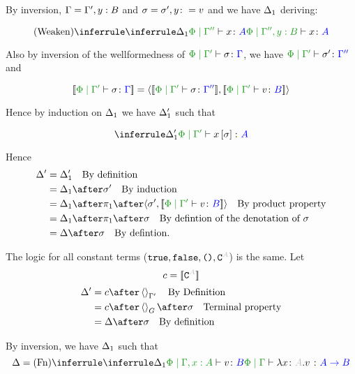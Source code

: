 \documentclass{report}
\begin{document}
By inversion, $\Gamma = \Gamma', y:B$ and $\sigma = \sigma', y\colon= v$
and we have $\Delta_1$ deriving:

\begin{equation}
    \ntreeruleI{Weaken}{\treeruleI{\D_1}{\etyperelation{\P}{\G''}{x}{A}}}{\etyperelation{\P}{\G'',y: B}{x}{A}}
\end{equation}

Also by inversion of the wellformedness of $\etyperelation{\P}{\G'}{\si}{\G}$, we have $\etyperelation{\P}{\G'}{\si'}{\G''}$ and 

\begin{equation}
    \deno{\etyperelation{\P}{\G'}{\si}{\G}} = \pr{\deno{\etyperelation{\P}{\G'}{\si}{\G''}}}{\deno{\etyperelation{\P}{\G'}{v}{B}}}
\end{equation}

Hence by induction on $\Delta_1$ we have $\Delta_1'$ such that

\begin{equation}
    \treeruleI{\D_1'}{\etyperelation{\P}{\G'}{x\ssi}{A}}
\end{equation}



Hence
\begin{align*}
    \D' & = \D_1' \qt{By definition}\\
        & = \D_1\after\si'\qt{By induction}\\
        & = \D_1\after\p\after\pr{\si'}{\deno{\etyperelation{\P}{\G'}{v}{B}}}\qt{By product property}\\
        & = \D_1\after\p\after\si\qt{By defintion of the denotation of $\si$}\\
        & = \D\after\si\qt{By defintion.}
\end{align*}

The logic for all constant terms ($\t,\f,\u,\const{A}$) is the same.
Let
\begin{equation}
    c = \deno{\const{A}}
\end{equation}
\begin{align*}
    \D' & = c\after\term{\G'}\qt{By Definition}\\
        & = c\after\term{G}\after\si\qt{Terminal property}\\
        & = \D\after\si\qt{By definition}
\end{align*}



By inversion, we have $\Delta_1$ such that
\begin{equation}
    \D = \ntreeruleI{Fn}{
        \treeruleI{\D_1}{\etyperelation{\P}{\G, x:A}{v}{B}}
    }{\etyperelation{\P}{\G}{\lam{x}{A}{v}}{\ab}}
\end{equation}
\end{document}
